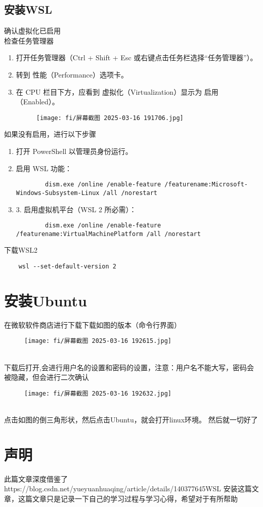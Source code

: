 \documentclass{article}
\begin{document}
\subsection{安装WSL}
确认虚拟化已启用
\\ \indent 检查任务管理器
\begin{enumerate}[(1)]%
    \item 打开任务管理器（Ctrl + Shift + Esc 或右键点击任务栏选择“任务管理器”）。
    \item 转到 性能（Performance）选项卡。
    \item 在 CPU 栏目下方，应看到 虚拟化（Virtualization）显示为 启用（Enabled）。
    \begin{figure}[h]
        \centering
        \texttt{[image: fi/屏幕截图 2025-03-16 191706.jpg]}
    \end{figure}
\end{enumerate}
如果没有启用，进行以下步骤
\begin{enumerate}[(1)]%
    \item 打开 PowerShell 以管理员身份运行。
    
    \item 启用 WSL 功能：
    \begin{lstlisting}
        dism.exe /online /enable-feature /featurename:Microsoft-Windows-Subsystem-Linux /all /norestart
    \end{lstlisting}

    \item  3. 启用虚拟机平台（WSL 2 所必需）：
    \begin{lstlisting}
        dism.exe /online /enable-feature /featurename:VirtualMachinePlatform /all /norestart
    \end{lstlisting}
\end{enumerate}
 \indent 下载WSL2
\begin{lstlisting}
    wsl --set-default-version 2
\end{lstlisting}

\section{安装Ubuntu}
在微软软件商店进行下载下载如图的版本（命令行界面）
\begin{figure}[h]
    \centering
    \texttt{[image: fi/屏幕截图 2025-03-16 192615.jpg]}
\end{figure}
\\ \indent 下载后打开,会进行用户名的设置和密码的设置，注意：用户名不能大写，密码会被隐藏，但会进行二次确认
\begin{figure}[h]
    \centering
    \texttt{[image: fi/屏幕截图 2025-03-16 192632.jpg]}
\end{figure}
\\ \indent 点击如图的倒三角形状，然后点击Ubuntu，就会打开linux环境。
然后就一切好了
\section{声明}
此篇文章深度借鉴了{https://blog.csdn.net/yueyuanhuaqing/article/details/140377645}{WSL 安装}这篇文章，这篇文章只是记录一下自己的学习过程与学习心得，希望对于有所帮助
\end{document}
